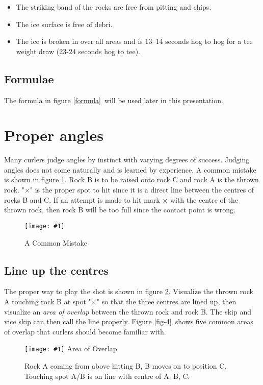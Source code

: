 \documentclass[titlepage,11pt]{article}
\newcommand{\img}[1]{\texttt{[image: \#1]}}
\newcommand{\pict}[4]{%
\begin{figure}[htp]%
    \centering%
	{#4}
    \def\boxX{#3}\ifx\boxX\empty
	\caption{\label{#1} #2}%
    \else
	\caption[#3]{\label{#1} #2}%
    \fi
\end{figure}%
}
\newcommand{\picfile}[4]{\pict{#1}{#2}{#3}{\img{#4}}}
\newcommand{\prtfloats}{\clearpage}
\begin{document}
\begin{itemize}
\item The striking band of the rocks are free from pitting and chips.
\item The ice surface is free of debri.
\item The ice is broken in over all areas and is 13--14 seconds hog to hog for a
      tee weight draw (23-24 seconds hog to tee).
\end{itemize}

\subsection*{Formulae}

The formula in figure \ref{formula}\ will be used later in this presentation.

\prtfloats

\section{Proper angles}

Many curlers judge angles by instinct with varying degrees of success. Judging
angles does not come naturally and is learned by experience. A common mistake is
shown in figure \ref{fig-2}. Rock B is to be raised onto rock C and rock A is the thrown
rock. "$\times$" is the proper spot to hit since it is a direct line between the
centres of rocks B and C. If an attempt is made to hit mark $\times$ with the centre of
the thrown rock, then rock B will be too full since the contact point is wrong.

\picfile{fig-2}{A Common Mistake}{}{fig02.eps}

\subsection*{Line up the centres}

The proper way to play the shot is shown in figure \ref{fig-3}. Visualize the thrown rock
A touching rock B at spot "$\times$" so that the three centres are lined up, then
visualize an \emph{area of overlap} between the thrown rock and rock B. The skip
and vice skip can then call the line properly. Figure \ref{fig-4}\ shows five common areas
of overlap that curlers should become familiar with.

\picfile{fig-3}{Rock A coming from above hitting B, B moves on to position C.
Touching spot A/B is on line with centre of A, B, C.}{Area of Overlap}{fig03.eps}
\end{document}
